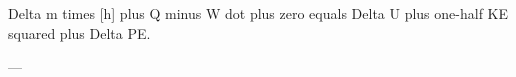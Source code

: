 Delta m times [h] plus Q minus W dot plus zero equals Delta U plus one-half KE squared plus Delta PE.  

---